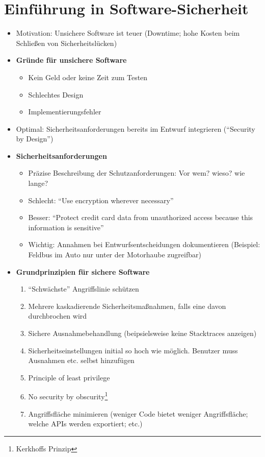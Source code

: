 \section{Einführung in Software-Sicherheit}
\begin{itemize}
	\item Motivation: Unsichere Software ist teuer (Downtime; hohe Kosten beim Schließen von Sicherheitslücken)
	\item \textbf{Gründe für unsichere Software}
	\begin{itemize}
		\item Kein Geld oder keine Zeit zum Testen
		\item Schlechtes Design
		\item Implementierungsfehler
	\end{itemize}
	\item Optimal: Sicherheitsanforderungen bereits im Entwurf integrieren ("`Security by Design"')
	\item \textbf{Sicherheitsanforderungen}
	\begin{itemize}
		\item Präzise Beschreibung der Schutzanforderungen: Vor wem? wieso? wie lange?
		\item Schlecht: "`Use encryption wherever necessary"'
		\item Besser: "`Protect credit card data from unauthorized access because this information is sensitive"'
		\item Wichtig: Annahmen bei Entwurfsentscheidungen dokumentieren (Beispiel: Feldbus im Auto nur unter der Motorhaube zugreifbar)
	\end{itemize}
	\item \textbf{Grundprinzipien für sichere Software}
	\begin{enumerate}
		\item "`Schwächste"' Angriffslinie schützen
		\item Mehrere kaskadierende Sicherheitsmaßnahmen, falls eine davon durchbrochen wird
		\item Sichere Ausnahmebehandlung (beipsielsweise keine Stacktraces anzeigen)
		\item Sicherheitseinstellungen initial so hoch wie möglich. Benutzer muss Ausnahmen etc. selbst hinzufügen
		\item Principle of least privilege
		\item No security by obscurity\footnote{Kerkhoffs Prinzip}
		\item Angriffsfläche minimieren (weniger Code bietet weniger Angriffsfläche; welche APIs werden exportiert; etc.)

\end{enumerate}
\end{itemize}
